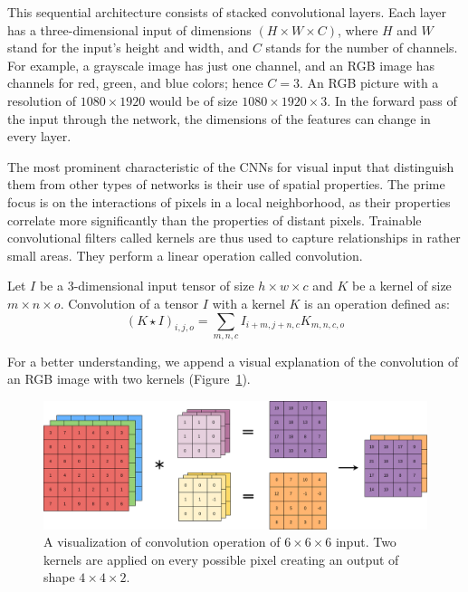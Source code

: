 This sequential architecture consists of stacked convolutional layers. Each layer has a three-dimensional input of dimensions $(H \times W \times C)$, where $H$ and $W$ stand for the input’s height and width, and $C$ stands for the number of channels. For example, a grayscale image has just one channel, and an RGB image has channels for red, green, and blue colors; hence $C = 3$. An RGB picture with a resolution of $1080 \times 1920$ would be of size $1080 \times 1920 \times 3$. In the forward pass of the input through the network, the dimensions of the features can change in every layer. 

The most prominent characteristic of the CNNs for visual input that distinguish them from other types of networks is their use of spatial properties. The prime focus is on the interactions of pixels in a local neighborhood, as their properties correlate more significantly than the properties of distant pixels. Trainable convolutional filters called kernels are thus used to capture relationships in rather small areas. They perform a linear operation called convolution.

\begin{defn}[Convolution]\label{def01:7}
	Let $I$ be a 3-dimensional input tensor of size $h \times w \times c$ and $K$ be a kernel of size $m \times n \times o$. Convolution of a tensor $I$ with a kernel $K$ is an operation defined as:
	\begin{equation}
		(K \star I)_{i, j, o} = \sum_{m, n, c} I_{i+m, j+n, c} K_{m, n, c, o}
	\end{equation}
\end{defn}

For a better understanding, we append a visual explanation of the convolution of an RGB image with two kernels (Figure~\ref{img02:conv}).

\begin{figure}[h]\centering
	\includegraphics[width=140mm]{../img/convolution.png}
	\caption{A visualization of convolution operation of $6\times6\times6$ input. Two kernels are applied on every possible pixel creating an output of shape $4\times4\times2$.}
	\label{img02:conv}
\end{figure}

